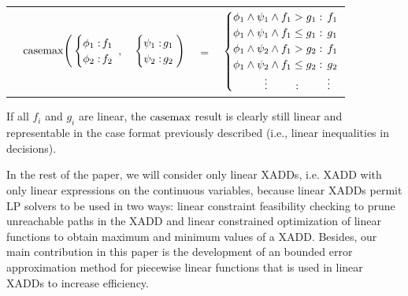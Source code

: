 \vspace{-5mm}
{\footnotesize
\begin{center}
\begin{tabular}{r c c c l}
&
\hspace{-7mm} $\casemax \Bigg(
  \begin{cases}
    \phi_1: \hspace{-2mm} & \hspace{-1mm} f_1 \\ 
    \phi_2: \hspace{-2mm} & \hspace{-1mm} f_2 \\ 
  \end{cases}$
$,$
&
\hspace{-4mm}
  $\begin{cases}
    \psi_1: \hspace{-2mm} & \hspace{-1mm} g_1 \\ 
    \psi_2: \hspace{-2mm} & \hspace{-1mm} g_2 \\ 
  \end{cases} \Bigg)$
&
\hspace{-4mm} 
$ = $
&
\hspace{-4mm}
  $\begin{cases}
  \phi_1 \wedge \psi_1 \wedge f_1 > g_1    : & \hspace{-2mm} f_1 \\ 
  \phi_1 \wedge \psi_1 \wedge f_1 \leq g_1 : & \hspace{-2mm} g_1 \\ 
  \phi_1 \wedge \psi_2 \wedge f_1 > g_2    : & \hspace{-2mm}f_1 \\ 
  \phi_1 \wedge \psi_2 \wedge f_1 \leq g_2 : & \hspace{-2mm} g_2 \\ 
  \hspace{1cm}\vdots \hspace{8mm}: & \hspace{-2mm} \vdots
  \end{cases}$
\end{tabular}
\end{center}
\vspace{-3mm}
} If all $f_i$ and $g_i$ are linear,
the $\mathrm{casemax}$ result is clearly still linear and representable in the case format previously described (i.e., linear inequalities in decisions).

In the rest of the paper, we will consider only linear XADDs, i.e. XADD with only linear expressions on the continuous variables, because linear XADDs permit LP solvers to be used in two ways: linear constraint feasibility checking to prune unreachable paths in the XADD and linear constrained optimization of linear functions to obtain maximum and minimum values of a XADD. Besides, our main contribution in this paper is the development of an bounded error approximation method for piecewise linear functions that is used in linear XADDs to increase efficiency.